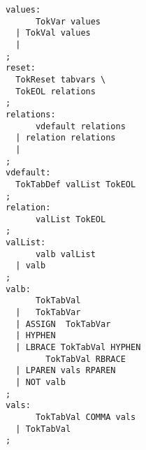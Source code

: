 \begin{minipage}[t]{2in}
\scriptsize
\begin{verbatim}
values:
      TokVar values
  | TokVal values
  |
;
reset:
  TokReset tabvars \
  TokEOL relations
;
relations:
      vdefault relations
  | relation relations
  |
;
vdefault:
  TokTabDef valList TokEOL
;
relation:
      valList TokEOL
;
valList:
      valb valList
  | valb
;
valb:
      TokTabVal
  |   TokTabVar
  | ASSIGN  TokTabVar
  | HYPHEN
  | LBRACE TokTabVal HYPHEN
        TokTabVal RBRACE
  | LPAREN vals RPAREN
  | NOT valb
;
vals:
      TokTabVal COMMA vals
  | TokTabVal
;
\end{verbatim}
\end{minipage}
